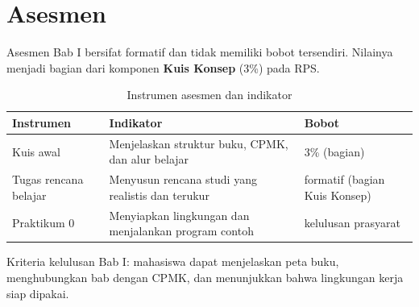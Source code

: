 \section*{Asesmen}

Asesmen Bab I bersifat formatif dan tidak memiliki bobot tersendiri.
Nilainya menjadi bagian dari komponen \textbf{Kuis Konsep} (3\%)
pada RPS.

\begin{table}[H]
\centering
\caption{Instrumen asesmen dan indikator}
\label{tab:ch01-asesmen}
\begin{tabularx}{\textwidth}{@{}lXl@{}}
\toprule
\textbf{Instrumen} & \textbf{Indikator} & \textbf{Bobot} \\
\midrule
Kuis awal & Menjelaskan struktur buku, CPMK, dan alur belajar &
3\% (bagian) \\
Tugas rencana belajar & Menyusun rencana studi yang realistis dan
terukur & formatif (bagian Kuis Konsep) \\
Praktikum 0 & Menyiapkan lingkungan dan menjalankan program contoh &
kelulusan prasyarat \\
\bottomrule
\end{tabularx}
\end{table}

Kriteria kelulusan Bab I: mahasiswa dapat menjelaskan peta buku,
menghubungkan bab dengan CPMK, dan menunjukkan bahwa lingkungan kerja
siap dipakai.
